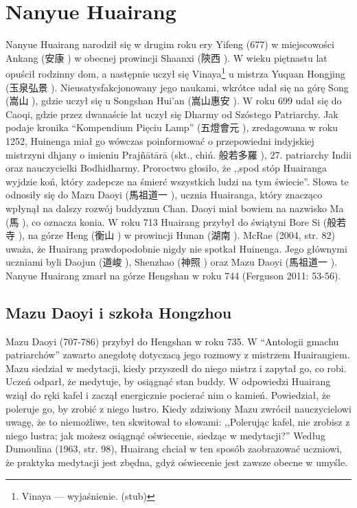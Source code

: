 \section{Nanyue Huairang}
Nanyue Huairang narodził się w drugim roku ery Yifeng (677) w miejscowości Ankang (安康 ) w obecnej prowincji Shaanxi (陝西 ).
W wieku piętnastu lat opuścił rodzinny dom, a następnie uczył się Vinaya\footnote{Vinaya --- wyjaśnienie. (stub)} u mistrza Yuquan Hongjing (玉泉弘景 ).
Nieusatysfakcjonowany jego naukami, wkrótce udał się na górę Song (嵩山 ), gdzie uczył się u Songshan Hui'an (嵩山惠安 ).
W roku 699 udał się do Caoqi, gdzie przez dwanaście lat uczył się Dharmy od Szóstego Patriarchy.
Jak podaje kronika ``Kompendium Pięciu Lamp'' (五燈會元 ), zredagowana w roku 1252, Huinenga miał go wówczas poinformować o przepowiedni indyjskiej mistrzyni dhjany o imieniu Prajñātārā (skt., chiń. 般若多羅 ), 27. patriarchy Indii oraz nauczycielki Bodhidharmy.
Proroctwo głosiło, że ,,spod stóp Huairanga wyjdzie koń, który zadepcze na śmierć wszystkich ludzi na tym świecie''.
Słowa te odnosiły się do Mazu Daoyi (馬祖道一 ), ucznia Huairanga, który znacząco wpłynął na dalszy rozwój buddyzmu Chan.
Daoyi miał bowiem na nazwisko Ma (馬 ), co oznacza konia.
W roku 713 Huairang przybył do świątyni Bore Si (般若寺 ), na górze Heng (衡山 ) w prowincji Hunan (湖南 ).
McRae (2004, str. 82) uważa, że Huairang prawdopodobnie nigdy nie spotkał Huinenga.
Jego głównymi uczniami byli Daojun (道峻 ), Shenzhao (神照 ) oraz Mazu Daoyi (馬祖道一 ).
Nanyue Huairang zmarł na górze Hengshan w roku 744
(Ferguson 2011: 53-56).

\subsection{Mazu Daoyi i szkoła Hongzhou}
Mazu Daoyi (707-786) przybył do Hengshan w roku 735.
W ``Antologii gmachu patriarchów'' zawarto anegdotę dotyczacą jego rozmowy z mistrzem Huairangiem.
Mazu siedział w medytacji, kiedy przyszedł do niego mistrz i zapytał go, co robi.
Uczeń odparł, że medytuje, by osiągnąć stan buddy.
W odpowiedzi Huairang wziął do ręki kafel i zaczął energicznie pocierać nim o kamień.
Powiedział, że poleruje go, by zrobić z niego lustro.
Kiedy zdziwiony Mazu zwrócił nauczycielowi uwagę, że to niemożliwe, ten skwitował to słowami: ,,Polerując kafel, nie zrobisz z niego lustra; jak możesz osiągnąć oświecenie, siedząc w medytacji?'' %
Według Dumoulina (1963, str. 98), Huairang chciał w ten sposób zaobrazować uczniowi, że praktyka medytacji jest zbędna, gdyż oświecenie jest zawsze obecne w umyśle.

